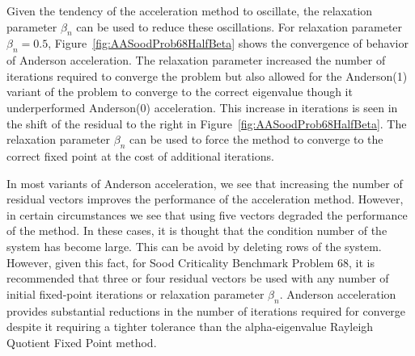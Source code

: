 Given the tendency of the acceleration method to oscillate, the relaxation parameter $\beta_{n}$ can be used to reduce these oscillations. For relaxation parameter $\beta_{n} = 0.5$, Figure~\ref{fig:AASoodProb68HalfBeta} shows the convergence of behavior of Anderson acceleration. The relaxation parameter increased the number of iterations required to converge the problem but also allowed for the Anderson(1) variant of the problem to converge to the correct eigenvalue though it underperformed Anderson(0) acceleration. This increase in iterations is seen in the shift of the residual to the right in Figure~\ref{fig:AASoodProb68HalfBeta}. The relaxation parameter $\beta_{n}$ can be used to force the method to converge to the correct fixed point at the cost of additional iterations.

In most variants of Anderson acceleration, we see that increasing the number of residual vectors improves the performance of the acceleration method. However, in certain circumstances we see that using five vectors degraded the performance of the method. In these cases, it is thought that the condition number of the system has become large. This can be avoid by deleting rows of the system. However, given this fact, for Sood Criticality Benchmark Problem 68, it is recommended that three or four residual vectors be used with any number of initial fixed-point iterations or relaxation parameter $\beta_{n}$. Anderson acceleration provides substantial reductions in the number of iterations required for converge despite it requiring a tighter tolerance than the alpha-eigenvalue Rayleigh Quotient Fixed Point method.

